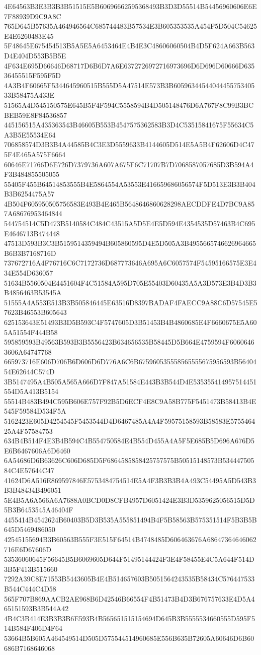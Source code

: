 {{{{{{{{{{{{{{{{{{{{{4E64563B3E3B3B3B51515E5B60696662595368493B3D3D55514B54456960606E6E7F88939D9C9A8C
765D645B57635A464946564C685744483B57534E3B605353535A454F5D504C54625E4E6260483E45
5F48645E675454513B5A5E5A6453464E4B4E3C48606060504B4D5F624A663B563D4E404D553B5B5E
4F634E695D66646D68717D6B6D7A6E6372726972716973696D6D696D60666D63536455515F595F5D
4A3B4F60665F5344645960515B555D5A47514E573B3B6059634454404445575340533B58475A433E
51565A4D545150575E645B5F4F594C5558594B4D505148476D6A767F8C99B3BCBEB59E8F84536857
445156515A435363543B46605B553B4547575362583B3D4C53515841675F55634C5A3B5E55534E64
706858574D3B3B4A44585B4C3E3D5559633B4144605D514E5A5B4F62606D4C475F4E465A575F6664
60646E71766D6E726D7379736A607A675F6C71707B7D7068587057685D3B594A4F3B484855505055
55405F455B64514853555B4E5864554A53553E416659686056574F5D513E3B3B404B3B6254475A57
4B504F605950505756583E493B4E465B5648646860628298AECDDFE4D7BC9A857A68676953464844
544754514C5D473B5140584C484C43515A5D5E4E5D594E4354535D57463B4C695E4646713B474448
47513D593B3C3B5159514359494B605860595D4E5D505A3B4955665746626964665B6B3B7168716D
737672716A4F76716C6C7172736D687773646A695A6C6057574F54595166575E3E434E554D636057
51634B5560504E4451604F4C51584A595D705E55403D60435A5A3D573E3B4D3B3B4856463B53545A
51555A4A553E513B3B505846445E63516D8397BADAF4FAECC9A88C6D57545E57623B46553B605643
625153643E51493B3D5B593C4F5747605D3B51453B4B4860685E4F6660675E5A605A51554F444B58
595859593B49563B593B3B5556423B634656535B58445D5B664E4759594F60606463606A64747768
665973716E606D706B6D606D6D776A6C6B675960535558565555675956593B5640454E62644C574D
3B5147495A4B505A565A666D7F847A51584E443B3B544D4E535355414957514451554D5A413B5154
55514B483B494C595B606E757F92B5D6ECF4E8C9A58B775F5451473B58413B4E545F59584D534F5A
5162423E605D4254545F5453544D4D6467485A4A4F59575158593B58583E575546425A4F57584753
634B4B514F4E3B4B594C4B554750584E4B554D455A4A5F5E685B5D696A676D5E6B6467606A6D6460
6A54686D6B63626C606D685D5F6864585858425757575B50515148573B53444750584C4E57644C47
41624D6A516E869597846E5753484754514E5A4F3B3B3B4A493C54495A5D543B3B3B48434B496051
5E4B5A6A566A6A7688A0BCD0D8CFB4957D6051424E3B3D5359625056515D5D5B3B6453545A46404F
4455414B4542624B60403B5D3B535A555851494B4F5B58563B575351514F5B3B5B645D5469486050
42545155694B3B60563B555F3E515F64514B4748485D606463676A68647364646062716E6D67606D
53536060645F56645B5B6069605D644F51495144424F3E4F58455E4C5A644F514D3B5F413B515660
7292A39C8E71553B5443605B4E4B514657603B5051564243535B58434C576447533B544C444C4D58
565F707B869AACB2AE968B6D42546B66554F4B51473B4D3B676757633E4D5A465151593B3B544A42
4B4C3B414E3B3B3B6E593B4B565651515154694D645B3B5555534660555D595F514B584F406D4F64
53664B5B605A464549514D505D575544514960685E556B635B72605A60646D6B60686B7168646068
}}}}}}}}}}}}}}}}}}}}}
